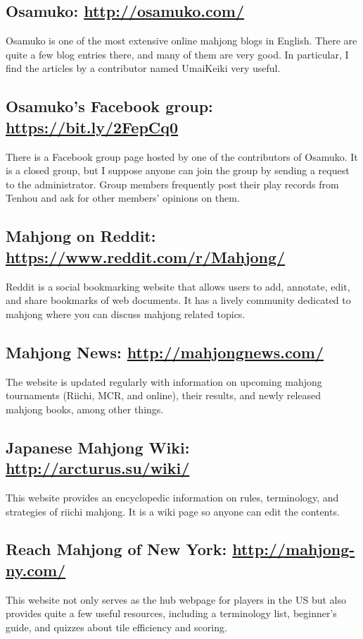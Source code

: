 \subsection*{Osamuko: \url{http://osamuko.com/}} 
Osamuko is one of the most extensive online mahjong blogs in English. There are quite a few blog entries there, and many of them are very good. In particular, I find the articles by a contributor named UmaiKeiki very useful. 

\subsection*{Osamuko's Facebook group: \url{https://bit.ly/2FepCq0}}
There is a Facebook group page hosted by one of the contributors of Osamuko. It is a closed group, but I suppose anyone can join the group by sending a request to the administrator. Group members frequently post their play records from {\jap Tenhou} and ask for other members' opinions on them. 

\subsection*{Mahjong on Reddit: \url{https://www.reddit.com/r/Mahjong/}}
Reddit is a social bookmarking website that allows users to add, annotate, edit, and share bookmarks of web documents. It has a lively community dedicated to mahjong where you can discuss mahjong related topics. 

\subsection*{Mahjong News: \url{http://mahjongnews.com/}}
The website is updated regularly with information on upcoming mahjong tournaments (Riichi, MCR, and online), their results, and newly released mahjong books, among other things. 

\subsection*{Japanese Mahjong Wiki: \url{http://arcturus.su/wiki/}}
This website provides an encyclopedic information on rules, terminology, and strategies of riichi mahjong. It is a wiki page so anyone can edit the contents. 

\subsection*{Reach Mahjong of New York: \url{http://mahjong-ny.com/}}
This website not only serves as the hub webpage for players in the US but also provides quite a few useful resources, including a terminology list, beginner's guide, and quizzes about tile efficiency and scoring.

